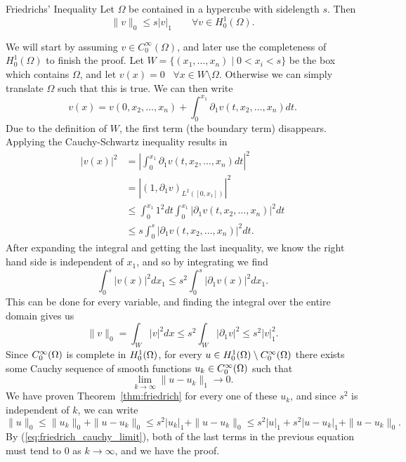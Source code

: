 \begin{thmx}{Friedrichs' Inequality}
Let $\Omega$ be contained in a hypercube with sidelength $s$. Then 
\begin{equation*}
    \| v \|_0 \leq s |v|_1 \quad \quad \forall v \in H_0^1(\Omega).
\end{equation*}\label{thm:friedrich}
\vspace{-8mm}
\end{thmx}
\begin{bev}
We will start by assuming $v \in C_0^{\infty}(\Omega)$, and later use the 
completeness of $H_0^1(\Omega)$ to finish the proof.
Let $W = \{ (x_1, \ldots, x_n) \mid 0 < x_i < s \}$ be the box 
which contains $\Omega$, and let $v(x)=0$ \, $\forall x
\in W\setminus \Omega$. Otherwise we can simply translate $\Omega$ such that 
this is true.
 We can then write 
\begin{equation*}
v(x)=v(0, x_2, \ldots, x_n) + \int_{0}^{x_1} \partial _1 v(t,x_2, \ldots, x_n) dt.
\end{equation*}
Due to the definition of $W$, the first term (the boundary term) 
disappears. Applying the Cauchy-Schwartz inequality results in 
\begin{align*}
    |v(x)|^2 &= \left|\int_{0}^{x_1} \partial _1 v(t,x_2, \ldots, x_n) dt \right|^2 \\ 
    &= |{(1, \partial _1 v)}_{L^2([0,x_1])}|^2 \\
    & \leq \int_{0}^{x_1} 1^2 dt \int_{0}^{x_1}|\partial_1 v(t, x_2, \ldots, x_n)|^2 dt \\ 
    &\leq s \int_{0}^{s}|\partial_1 v(t, x_2, \ldots, x_n)|^2 dt. 
\end{align*}
After expanding the integral and getting the last inequality, we know 
the right hand side is independent of $x_1$, and so by integrating we find 
\begin{equation*}
    \int_{0}^{s}|v(x)|^2dx_1 \leq s^2\int_{0}^{s}|\partial _1 v(x)|^2dx_1.
\end{equation*}
This can be done for every variable, and finding the integral over the entire 
domain gives us 
\begin{equation*}
    \|v\|_0 = \int_{W}|v|^2 dx \leq s^2 \int_{W} |\partial _1v|^2 \leq s^2 |v|_1^2.
\end{equation*}
Since $C^\infty_0(\Omega)$ is complete in $H_0^1(\Omega)$, for every $u \in H_0^1(\Omega)\setminus C^\infty_0(\Omega)$
there exists some Cauchy sequence of smooth functions $u_k \in C^\infty_0(\Omega)$
 such that 
\begin{equation}
    \lim_{k \to \infty} \| u-u_k\|_1 \to 0.
    \label{eq:friedrich_cauchy_limit}
\end{equation}
We have proven Theorem~\ref*{thm:friedrich} for every one of these $u_k$, and 
since $s^2$ is independent of $k$, we can write 
\begin{equation*}
    \|u\|_0 \leq \|u_k\|_0 + \|u-u_k\|_0 \leq  s^2|u_k|_1 +  \|u-u_k\|_0 \leq s^2|u|_1 + s^2|u-u_k|_1 + \|u-u_k\|_0.
\end{equation*}
By (\ref*{eq:friedrich_cauchy_limit}), both of the last terms in the 
previous equation must tend to $0$ as $k \to \infty$, and we have the proof.
\end{bev}

